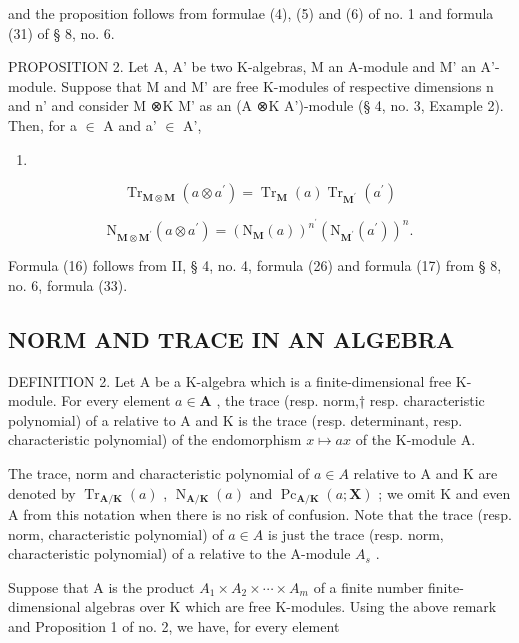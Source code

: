 and the proposition follows from formulae (4), (5) and (6) of no. 1 and formula (31) of § 8, no. 6.

PROPOSITION 2. Let A, A' be two K-algebras, M an A-module and M' an A'-module. Suppose that M and M' are free K-modules of respective dimensions n and n' and consider M ⊗K M' as an (A ⊗K A')-module (§ 4, no. 3, Example 2). Then, for a \ensuremath{\in} A and a' \ensuremath{\in} A',

\begin{enumerate}
\def\labelenumi{(\arabic{enumi})}
\setcounter{enumi}{15}
\tightlist
\item
\end{enumerate}

\[
\operatorname{Tr} _ {\mathbf {M} \otimes \mathbf {M}} (a \otimes a ^ {\prime}) = \operatorname{Tr} _ {\mathbf {M}} (a) \operatorname{Tr} _ {\mathbf {M} ^ {\prime}} (a ^ {\prime})\tag{17}
\]

\[
\mathrm{N} _ {\mathbf {M} \otimes \mathbf {M} ^ {\prime}} (a \otimes a ^ {\prime}) = (\mathrm{N} _ {\mathbf {M}} (a)) ^ {n ^ {\prime}} (\mathrm{N} _ {\mathbf {M} ^ {\prime}} (a ^ {\prime})) ^ {n}.
\]

Formula (16) follows from II, § 4, no. 4, formula (26) and formula (17) from § 8, no. 6, formula (33).

\subsection{NORM AND TRACE IN AN ALGEBRA}

DEFINITION 2. Let A be a K-algebra which is a finite-dimensional free K-module. For every element \(a \in \mathbf{A}\) , the trace (resp. norm,† resp. characteristic polynomial) of a relative to A and K is the trace (resp. determinant, resp. characteristic polynomial) of the endomorphism \(x \mapsto ax\) of the K-module A.

The trace, norm and characteristic polynomial of \(a \in A\) relative to A and K are denoted by \(\operatorname{Tr}_{\mathbf{A}/\mathbf{K}}(a)\) , \(\operatorname{N}_{\mathbf{A}/\mathbf{K}}(a)\) and \(\operatorname{Pc}_{\mathbf{A}/\mathbf{K}}(a; \mathbf{X})\) ; we omit K and even A from this notation when there is no risk of confusion. Note that the trace (resp. norm, characteristic polynomial) of \(a \in A\) is just the trace (resp. norm, characteristic polynomial) of a relative to the A-module \(A_{s}\) .

Suppose that A is the product \(A_{1} \times A_{2} \times \cdots \times A_{m}\) of a finite number finite-dimensional algebras over K which are free K-modules. Using the above remark and Proposition 1 of no. 2, we have, for every element

